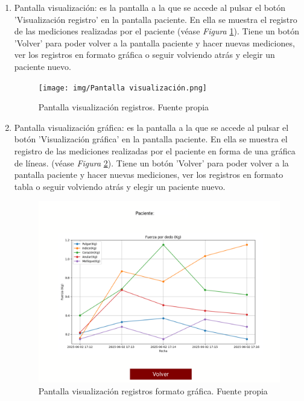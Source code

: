\begin{enumerate}
    \item Pantalla visualización: es la pantalla a la que se accede al pulsar el botón 'Visualización registro' en la pantalla paciente. En ella se muestra el registro de las mediciones realizadas por el paciente (véase \textit{Figura} \ref{fig:Pantalla visualización}). Tiene un botón 'Volver' para poder volver a la pantalla paciente y hacer nuevas mediciones, ver los registros en formato gráfica o seguir volviendo atrás y elegir un paciente nuevo.
    \begin{figure}
        \centering
        \texttt{[image: img/Pantalla visualización.png]}
        \caption{Pantalla visualización registros. Fuente propia}
        \label{fig:Pantalla visualización}
    \end{figure}
    \item Pantalla visualización gráfica: es la pantalla a la que se accede al pulsar el botón 'Visualización gráfica' en la pantalla paciente. En ella se muestra el registro de las mediciones realizadas por el paciente en forma de una gráfica de líneas. (véase \textit{Figura} \ref{fig:Pantalla grafica}). Tiene un botón 'Volver' para poder volver a la pantalla paciente y hacer nuevas mediciones, ver los registros en formato tabla o seguir volviendo atrás y elegir un paciente nuevo.
    \begin{figure}
        \centering
        \includegraphics[width=0.75\linewidth]{img/Pantalla grafica.png}
        \caption{Pantalla visualización registros formato gráfica. Fuente propia}
        \label{fig:Pantalla grafica}
    \end{figure}
\end{enumerate}